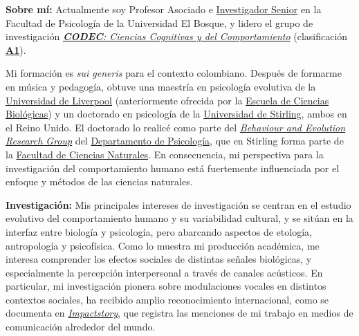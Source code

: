 \documentclass[11pt,a4paper,]{awesome-cv}
\begin{document}
\begin{footnotesize}

\textbf{Sobre mí:} Actualmente soy Profesor Asociado e \href{https://scienti.minciencias.gov.co/cvlac/visualizador/generarCurriculoCv.do?cod_rh=0001348945}{Investigador Senior} en la Facultad de Psicología de la Universidad El Bosque, y lidero el grupo de investigación \href{https://grupo-codec.netlify.app/}{\textit{\textbf{CODEC}: Ciencias Cognitivas y del Comportamiento}} (clasificación \textbf{\href{https://scienti.minciencias.gov.co/gruplac/jsp/visualiza/visualizagr.jsp?nro=00000000001446}{A1}}). 

Mi formación es \textit{sui generis} para el contexto colombiano. Después de formarme en música y pedagogía, obtuve una maestría en psicología evolutiva de la \href{https://www.liverpool.ac.uk/}{Universidad de Liverpool} (anteriormente ofrecida por la \href{https://www.liverpool.ac.uk/life-sciences/}{Escuela de Ciencias Biológicas}) y un doctorado en psicología de la \href{https://www.stir.ac.uk/}{Universidad de Stirling}, ambos en el Reino Unido. El doctorado lo realicé como parte del \textit{\href{https://www.stir.ac.uk/about/faculties/natural-sciences/our-research/research-groups/behaviour-and-evolution-research-group/}{Behaviour and Evolution Research Group}} del \href{https://www.stir.ac.uk/about/faculties/natural-sciences/psychology/}{Departamento de Psicología}, que en Stirling forma parte de la \href{https://www.stir.ac.uk/about/faculties/natural-sciences/departments/}{Facultad de Ciencias Naturales}. En consecuencia, mi perspectiva para la investigación del comportamiento humano está fuertemente influenciada por el enfoque y métodos de las ciencias naturales.

\textbf{Investigación:} Mis principales intereses de investigación se centran en el estudio evolutivo del comportamiento humano y su variabilidad cultural, y se sitúan en la interfaz entre biología y psicología, pero abarcando aspectos de etología, antropología y psicofísica. Como lo muestra mi producción académica, me interesa comprender los efectos sociales de distintas señales biológicas, y especialmente la percepción interpersonal a través de canales acústicos. En particular, mi investigación pionera sobre modulaciones vocales en distintos contextos sociales, ha recibido amplio reconocimiento internacional, como se documenta en \href{https://profiles.impactstory.org/u/0000-0002-0092-6298}{\textit{Impactstory}}, que registra las menciones de mi trabajo en medios de comunicación alrededor del mundo.


\end{footnotesize}
\end{document}
